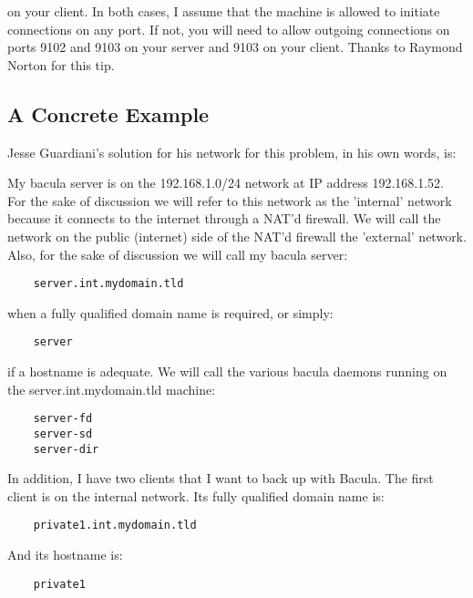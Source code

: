 on your client. In both cases, I assume that the machine is allowed to
initiate connections on any port. If not, you will need to allow outgoing
connections on ports 9102 and 9103 on your server and 9103 on your client.
Thanks to Raymond Norton for this tip. 

\subsection*{A Concrete Example}

Jesse Guardiani's solution for his network for this problem, in his own words,
is: 

My bacula server is on the 192.168.1.0/24 network at IP address 192.168.1.52.
For the sake of discussion we will refer to this network as the 'internal'
network because it connects to the internet through a NAT'd firewall. We will
call the network on the public (internet) side of the NAT'd firewall the
'external' network. Also, for the sake of discussion we will call my bacula
server: 

\footnotesize
\begin{verbatim}
    server.int.mydomain.tld
\end{verbatim}
\normalsize

when a fully qualified domain name is required, or simply: 

\footnotesize
\begin{verbatim}
    server
\end{verbatim}
\normalsize

if a hostname is adequate. We will call the various bacula daemons running on
the server.int.mydomain.tld machine: 

\footnotesize
\begin{verbatim}
    server-fd
    server-sd
    server-dir
\end{verbatim}
\normalsize

In addition, I have two clients that I want to back up with Bacula. The first
client is on the internal network. Its fully qualified domain name is: 

\footnotesize
\begin{verbatim}
    private1.int.mydomain.tld
\end{verbatim}
\normalsize

And its hostname is: 

\footnotesize
\begin{verbatim}
    private1
\end{verbatim}
\normalsize

